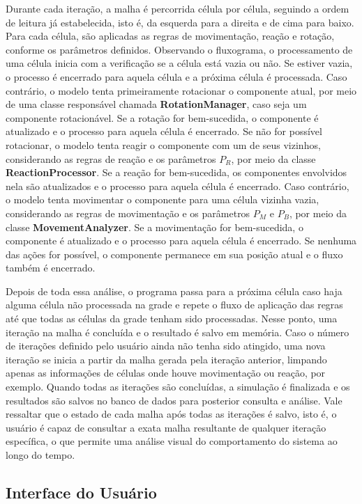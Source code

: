 \documentclass[12pt,oneside]{report}
\begin{document}
Durante cada iteração, a malha é percorrida célula por célula, seguindo a ordem de leitura já estabelecida, isto é, da esquerda para a direita e de cima para baixo. Para cada célula, são aplicadas as regras de movimentação, reação e rotação, conforme os parâmetros definidos. Observando o fluxograma, o processamento de uma célula inicia com a verificação se a célula está vazia ou não. Se estiver vazia, o processo é encerrado para aquela célula e a próxima célula é processada. Caso contrário, o modelo tenta primeiramente rotacionar o componente atual, por meio de uma classe responsável chamada \textbf{RotationManager}, caso seja um componente rotacionável. Se a rotação for bem-sucedida, o componente é atualizado e o processo para aquela célula é encerrado. Se não for possível rotacionar, o modelo tenta reagir o componente com um de seus vizinhos, considerando as regras de reação e os parâmetros $P_R$, por meio da classe \textbf{ReactionProcessor}. Se a reação for bem-sucedida, os componentes envolvidos nela são atualizados e o processo para aquela célula é encerrado. Caso contrário, o modelo tenta movimentar o componente para uma célula vizinha vazia, considerando as regras de movimentação e os parâmetros $P_M$ e $P_B$, por meio da classe \textbf{MovementAnalyzer}. Se a movimentação for bem-sucedida, o componente é atualizado e o processo para aquela célula é encerrado. Se nenhuma das ações for possível, o componente permanece em sua posição atual e o fluxo também é encerrado.

Depois de toda essa análise, o programa passa para a próxima célula caso haja alguma célula não processada na grade e repete o fluxo de aplicação das regras até que todas as células da grade tenham sido processadas. Nesse ponto, uma iteração na malha é concluída e o resultado é salvo em memória. Caso o número de iterações definido pelo usuário ainda não tenha sido atingido, uma nova iteração se inicia a partir da malha gerada pela iteração anterior, limpando apenas as informações de células onde houve movimentação ou reação, por exemplo. Quando todas as iterações são concluídas, a simulação é finalizada e os resultados são salvos no banco de dados para posterior consulta e análise. Vale ressaltar que o estado de cada malha após todas as iterações é salvo, isto é, o usuário é capaz de consultar a exata malha resultante de qualquer iteração específica, o que permite uma análise visual do comportamento do sistema ao longo do tempo.


\subsection{Interface do Usuário}
\end{document}
